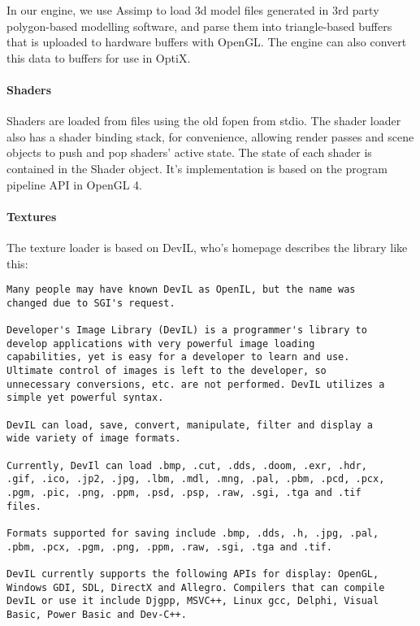 In our engine, we use Assimp to load 3d model files generated in 3rd party polygon-based modelling software, and parse them into triangle-based buffers that is uploaded to hardware buffers with OpenGL. The engine can also convert this data to buffers for use in OptiX.

\paragraph{Shaders}
Shaders are loaded from files using the old fopen from stdio. The shader loader also has a shader binding stack, for convenience, allowing render passes and scene objects to push and pop shaders' active state.
The state of each shader is contained in the Shader object. It's implementation is based on the program pipeline API in OpenGL 4.

\paragraph{Textures}
The texture loader is based on DevIL, who's homepage \cite{devil_homepage} describes the library like this:
\begin{Verbatim}[frame=single,fontshape=it,framesep=1mm]
Many people may have known DevIL as OpenIL, but the name was 
changed due to SGI's request.

Developer's Image Library (DevIL) is a programmer's library to 
develop applications with very powerful image loading 
capabilities, yet is easy for a developer to learn and use. 
Ultimate control of images is left to the developer, so 
unnecessary conversions, etc. are not performed. DevIL utilizes a 
simple yet powerful syntax. 

DevIL can load, save, convert, manipulate, filter and display a 
wide variety of image formats.

Currently, DevIl can load .bmp, .cut, .dds, .doom, .exr, .hdr, 
.gif, .ico, .jp2, .jpg, .lbm, .mdl, .mng, .pal, .pbm, .pcd, .pcx, 
.pgm, .pic, .png, .ppm, .psd, .psp, .raw, .sgi, .tga and .tif 
files.

Formats supported for saving include .bmp, .dds, .h, .jpg, .pal, 
.pbm, .pcx, .pgm, .png, .ppm, .raw, .sgi, .tga and .tif.

DevIL currently supports the following APIs for display: OpenGL, 
Windows GDI, SDL, DirectX and Allegro. Compilers that can compile 
DevIL or use it include Djgpp, MSVC++, Linux gcc, Delphi, Visual 
Basic, Power Basic and Dev-C++.
\end{Verbatim}

